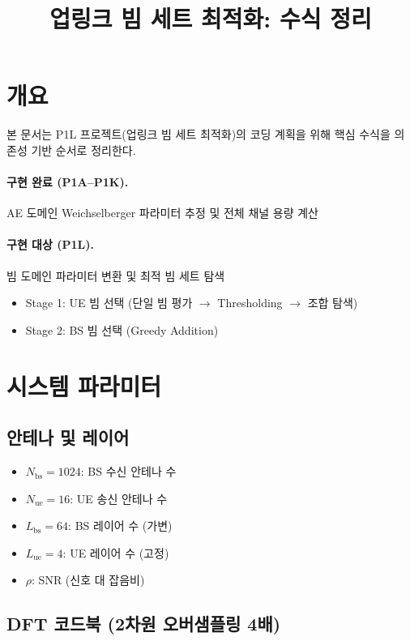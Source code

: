 \documentclass[10pt]{article}
\title{업링크 빔 세트 최적화: 수식 정리}
\author{}
\date{}
\begin{document}
\maketitle

\section*{개요}
본 문서는 P1L 프로젝트(업링크 빔 세트 최적화)의 코딩 계획을 위해 핵심 수식을 의존성 기반 순서로 정리한다.

\paragraph{구현 완료 (P1A--P1K).} AE 도메인 Weichselberger 파라미터 추정 및 전체 채널 용량 계산

\paragraph{구현 대상 (P1L).} 빔 도메인 파라미터 변환 및 최적 빔 세트 탐색
\begin{itemize}
    \item Stage 1: UE 빔 선택 (단일 빔 평가 $\rightarrow$ Thresholding $\rightarrow$ 조합 탐색)
    \item Stage 2: BS 빔 선택 (Greedy Addition)
\end{itemize}

\section{시스템 파라미터}

\subsection{안테나 및 레이어}
\begin{itemize}
    \item $N_{\text{bs}} = 1024$: BS 수신 안테나 수
    \item $N_{\text{ue}} = 16$: UE 송신 안테나 수
    \item $L_{\text{bs}} = 64$: BS 레이어 수 (가변)
    \item $L_{\text{ue}} = 4$: UE 레이어 수 (고정)
    \item $\rho$: SNR (신호 대 잡음비)
\end{itemize}

\subsection{DFT 코드북 (2차원 오버샘플링 4배)}
\end{document}
